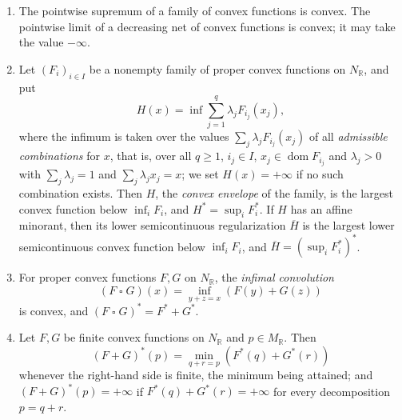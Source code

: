 \begin{proposition}\label{prop:convex-envelope-algebra}
\begin{enumerate}
\item The pointwise supremum of a family of convex functions is convex. The pointwise limit of a decreasing net of convex functions is convex; it may take the value $-\infty$.
\item Let $(F_i)_{i\in I}$ be a nonempty family of proper convex functions on $N_{\mathbb R}$, and put
\[
 H(x)=\inf\sum_{j=1}^q\lambda_jF_{i_j}(x_j),
\]
where the infimum is taken over the values $\sum_j\lambda_jF_{i_j}(x_j)$ of all \emph{admissible combinations} for $x$, that is, over all $q\geq1$, $i_j\in I$, $x_j\in\operatorname{dom}F_{i_j}$ and $\lambda_j>0$ with $\sum_j\lambda_j=1$ and $\sum_j\lambda_jx_j=x$; we set $H(x)=+\infty$ if no such combination exists. Then $H$, the \emph{convex envelope} of the family, is the largest convex function below $\inf_iF_i$, and $H^*=\sup_iF_i^*$. If $H$ has an affine minorant, then its lower semicontinuous regularization $\overline H$ is the largest lower semicontinuous convex function below $\inf_iF_i$, and $\overline H=(\sup_iF_i^*)^*$.
\item For proper convex functions $F,G$ on $N_{\mathbb R}$, the \emph{infimal convolution}
\[
 (F\mathbin\square G)(x)=\inf_{y+z=x}(F(y)+G(z))
\]
is convex, and $(F\mathbin\square G)^*=F^*+G^*$.
\item Let $F,G$ be finite convex functions on $N_{\mathbb R}$ and $p\in M_{\mathbb R}$. Then
\[
 (F+G)^*(p)=\min_{q+r=p}(F^*(q)+G^*(r))
\]
whenever the right-hand side is finite, the minimum being attained; and $(F+G)^*(p)=+\infty$ if $F^*(q)+G^*(r)=+\infty$ for every decomposition $p=q+r$.
\end{enumerate}
\end{proposition}
